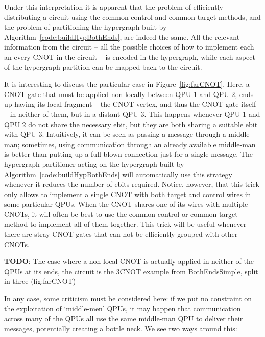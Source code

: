 Under this interpretation it is apparent that the problem of efficiently distributing a circuit using the common-control and common-target methods, and the problem of partitioning the hypergraph built by Algorithm~\ref{code:buildHypBothEnds}, are indeed the same. All the relevant information from the circuit -- all the possible choices of how to implement each an every CNOT in the circuit -- is encoded in the hypergraph, while each aspect of the hypergraph partition can be mapped back to the circuit.

It is interesting to discuss the particular case in Figure~\ref{fig:farCNOT}. Here, a CNOT gate that must be applied non-locally between QPU \(1\) and QPU \(2\), ends up having its local fragment -- the CNOT-vertex, and thus the CNOT gate itself --  in neither of them, but in a distant QPU \(3\). This happens whenever QPU \(1\) and QPU \(2\) do not share the necessary ebit, but they are both sharing a suitable ebit with QPU \(3\). Intuitively, it can be seen as passing a message through a middle-man; sometimes, using communication through an already available middle-man is better than putting up a full blown connection just for a single message. The hypergraph partitioner acting on the hypergraph built by Algorithm~\ref{code:buildHypBothEnds} will automatically use this strategy whenever it reduces the number of ebits required. Notice, however, that this trick only allows to implement a single CNOT with both target and control wires in some particular QPUs. When the CNOT shares one of its wires with multiple CNOTs, it will often be best to use the common-control or common-target method to implement all of them together. This trick will be useful whenever there are stray CNOT gates that can not be efficiently grouped with other CNOTs.

\textbf{TODO}: The case where a non-local CNOT is actually applied in neither of the QPUs at its ends, the circuit is the 3CNOT example from BothEndsSimple, split in three (fig:farCNOT)

In any case, some criticism must be considered here: if we put no constraint on the exploitation of `middle-men' QPUs, it may happen that communication across many of the QPUs all use the same middle-man QPU to deliver their messages, potentially creating a bottle neck. We see two ways around this:

